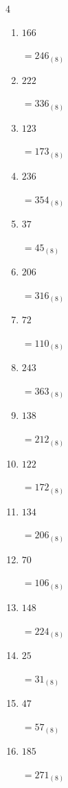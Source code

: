\begin{multicols}{4}
\begin{enumerate}
        $=73_{(8)}$

  \item $166$

        $=246_{(8)}$

  \item $222$

        $=336_{(8)}$

  \item $123$

        $=173_{(8)}$

  \item $236$

        $=354_{(8)}$

  \item $37$

        $=45_{(8)}$

  \item $206$

        $=316_{(8)}$

  \item $72$

        $=110_{(8)}$

  \item $243$

        $=363_{(8)}$

  \item $138$

        $=212_{(8)}$

  \item $122$

        $=172_{(8)}$

  \item $134$

        $=206_{(8)}$

  \item $70$

        $=106_{(8)}$

  \item $148$

        $=224_{(8)}$

\columnbreak %

  \item $25$

        $=31_{(8)}$

  \item $47$

        $=57_{(8)}$

  \item $185$

        $=271_{(8)}$


\end{enumerate}
\end{multicols}
